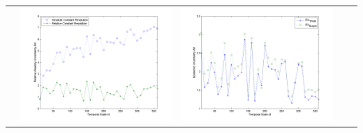 \documentclass[11pt]{article}
\begin{document}
\begin{table}[H]
{\begin{tabular}{c  c   c   c  c }
&\begin{minipage}{.4\textwidth}\includegraphics[width=\linewidth]{resultgraph/06908000AU.png}\end{minipage}
&\begin{minipage}{.4\textwidth}\includegraphics[width=\linewidth]{resultgraph/06908000EU.png}\end{minipage}
\\

\end{tabular}}
\end{table}
\end{document}
